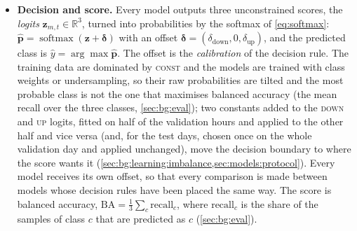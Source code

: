 \begin{itemize}[nosep]
  $E \subseteq V \times V$.  The transaction graph is bipartite,
  $V = \mathcal{W} \cup \mathcal{M}$ with every edge joining a wallet to a market, and
  dynamic: an edge is an event $e = (w, m, t, \mathbf{a}_e)$, a fill of wallet $w$ on
  market $m$ at time $t$ with attributes $\mathbf{a}_e \in \mathbb{R}^{7}$ (side, role, log
  collateral, log tokens, price, fee, token orientation; \cref{sec:models:mp}).  $E_t$ is the set of edges
  of block $t$ and $N_t(v)$ the edges of $E_t$ incident to node $v$.  Wallets have states
  $\mathbf{h}_w(t) \in \mathbb{R}^{d}$ like markets.  
  draws this object and gives its two readings, static and temporal.
  \item \textbf{Decision and score.}  Every model outputs three unconstrained scores, the
  \emph{logits} $\mathbf{z}_{m,t} \in \mathbb{R}^{3}$, turned into probabilities by the softmax
  of \cref{eq:softmax}:
  $\hat{\mathbf{p}} = \operatorname{softmax}(\mathbf{z} + \boldsymbol{\delta})$ with an
  offset $\boldsymbol{\delta} = (\delta_{\mathrm{down}}, 0, \delta_{\mathrm{up}})$, and the
  predicted class is $\hat{y} = \arg\max \hat{\mathbf{p}}$.  The offset is the
  \emph{calibration} of the decision rule.  The training data are dominated by
  \textsc{const} and the models are trained with class weights or undersampling, so their
  raw probabilities are tilted and the most probable class is not the one that maximises
  balanced accuracy (the mean recall over the three classes, \cref{sec:bg:eval}); two constants added to the \textsc{down} and \textsc{up} logits,
  fitted on half of the validation hours and applied to the other half and vice versa (and,
  for the test days, chosen once on the whole validation day and applied unchanged), move
  the decision boundary to where the score wants it
  (\cref{sec:bg:learning:imbalance,sec:models:protocol}).  Every model receives its own
  offset, so that every comparison is made between models whose decision rules have been
  placed the same way.  The score is balanced accuracy,
  $\mathrm{BA} = \tfrac{1}{3} \sum_{c} \mathrm{recall}_c$, where $\mathrm{recall}_c$ is the
  share of the samples of class $c$ that are predicted as $c$ (\cref{sec:bg:eval}).
\end{itemize}







